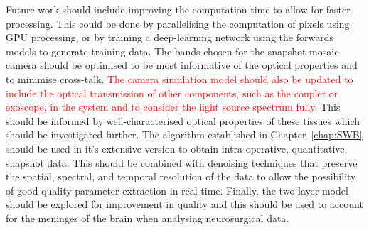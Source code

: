 Future work should include improving the computation time to allow for faster processing. This could be done by parallelising the computation of pixels using GPU processing, or by training a deep-learning network using the forwards models to generate training data. The bands chosen for the snapshot mosaic camera should be optimised to be most informative of the optical properties and to minimise cross-talk. \textcolor{red}{The camera simulation model should also be updated to include the optical transmission of other components, such as the coupler or exoscope, in the system and to consider the light source spectrum fully.} This should be informed by well-characterised optical properties of these tissues which should be investigated further. The algorithm established in Chapter~\ref{chap:SWB} should be used in it's extensive version to obtain intra-operative, quantitative, snapshot data. This should be combined with denoising techniques that preserve the spatial, spectral, and temporal resolution of the data to allow the possibility of good quality parameter extraction in real-time. Finally, the two-layer model should be explored for improvement in quality and this should be used to account for the meninges of the brain when analysing neurosurgical data. 

